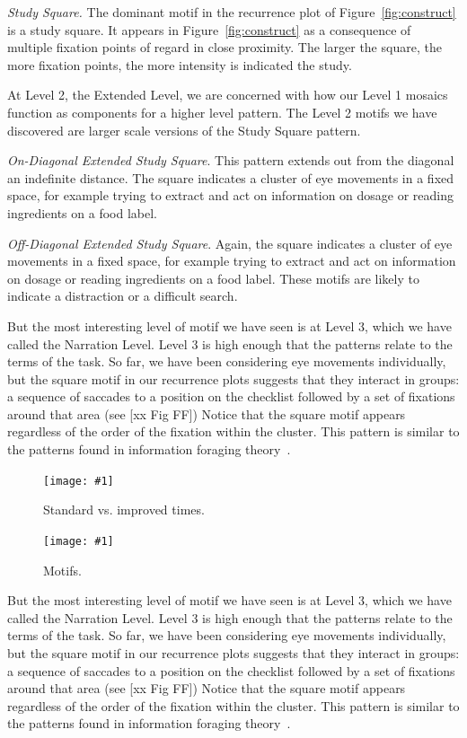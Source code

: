 \documentclass{sigchi}
\newcommand{\insertpicture}[2]{\begin{center}\texttt{[image: \#1]}\end{center}}
\begin{document}
\emph{Study Square.} The dominant motif in the recurrence plot of Figure~\ref{fig:construct} is a study square. It appears in  Figure~\ref{fig:construct} as a consequence of multiple fixation 
points of regard in close proximity. The larger the square, the 
more fixation points, the more intensity is indicated the study.

At Level 2, the Extended Level, we are concerned with how our Level 1 mosaics function as components for a higher level pattern. The Level 2 motifs we have discovered are larger scale versions of the Study Square pattern.

\emph{On-Diagonal Extended Study Square}.  This pattern extends out from the diagonal an indefinite distance. The square indicates a cluster of eye movements in a fixed space, for example trying to extract and act on information on dosage or reading ingredients on a food label.

\emph{Off-Diagonal Extended Study Square}.  Again, the square indicates a cluster of eye movements in a fixed space, for example trying to extract and act on information on dosage or reading ingredients on a food label. These motifs are likely to indicate a distraction or a difficult search.

But the most interesting level of motif we have seen is at Level 3, which we have called the Narration Level. Level 3 is high enough that the patterns relate to the terms of the task.  So
far, we have been considering eye movements individually, but the square
motif in our recurrence plots suggests that they interact in groups: a
sequence of saccades to a position on the checklist followed by a set of
fixations around that area (see [xx Fig FF]) Notice that the square motif
appears regardless of the order of the fixation within the cluster. This
pattern is similar to the patterns found in information foraging
theory~\cite{Pirolli_1999}. 
\begin{figure}
\insertpicture{figures/time2.pdf}{0.4}
\caption{Standard vs. improved times.\label{fig:time}}
\end{figure}

\begin{figure}
\insertpicture{figures/motifs2.pdf}{0.5}
\caption{Motifs.\label{fig:motifs}}
\end{figure}

But the most interesting level of motif we have seen is at Level 3, which we have called the Narration Level. Level 3 is high enough that the patterns relate to the terms of the task.  So
far, we have been considering eye movements individually, but the square
motif in our recurrence plots suggests that they interact in groups: a
sequence of saccades to a position on the checklist followed by a set of
fixations around that area (see [xx Fig FF]) Notice that the square motif
appears regardless of the order of the fixation within the cluster. This
pattern is similar to the patterns found in information foraging
theory~\cite{Pirolli_1999}. 
\end{document}
